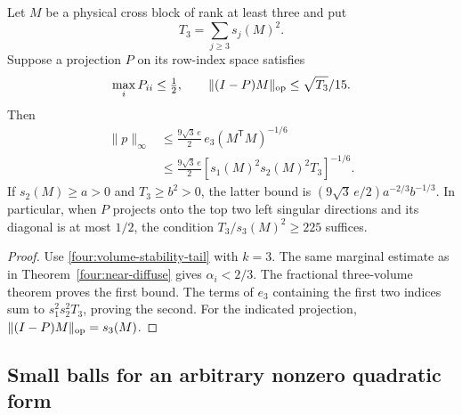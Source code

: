 \begin{corollary}\label{four:tail}
Let \(M\) be a physical cross block of rank at least three and put
\[
 T_3=\sum_{j\geq3}s_j(M)^2.
\]
Suppose a projection \(P\) on its row-index space satisfies
\[
 \max_iP_{ii}\leq\tfrac12,\qquad
 \|(I-P)M\|_{\rm op}\leq\sqrt{T_3}/15.
\]
Then
\begin{align}
 \|p\|_\infty
 &\leq\frac{9\sqrt3\,e}{2}\,e_3(M^{\mathsf T}M)^{-1/6}
 \label{four:tail-bound}\\
 &\leq\frac{9\sqrt3\,e}{2}
           [s_1(M)^2s_2(M)^2T_3]^{-1/6}.
 \nonumber
\end{align}
If \(s_2(M)\geq a>0\) and \(T_3\geq b^2>0\), the latter
bound is \((9\sqrt3\,e/2)a^{-2/3}b^{-1/3}\).
In particular, when \(P\) projects onto the top two left singular
directions and its diagonal is at most \(1/2\), the condition
\(T_3/s_3(M)^2\geq225\) suffices.
\end{corollary}
\begin{proof}
Use \eqref{four:volume-stability-tail} with \(k=3\).
The same marginal estimate as in
Theorem~\ref{four:near-diffuse} gives \(\alpha_i<2/3\).
The fractional three-volume theorem proves the first bound.
The terms of \(e_3\) containing the first two indices sum to
\(s_1^2s_2^2T_3\), proving the second.  For the indicated
projection, \(\|(I-P)M\|_{\rm op}=s_3(M)\).
\end{proof}

\subsection{Small balls for an arbitrary nonzero quadratic form}

